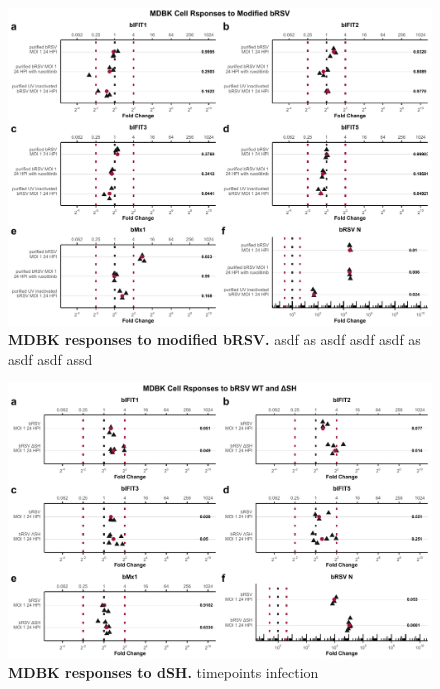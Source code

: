 \begin{figure}
    \centering
    \includegraphics[width=1\linewidth]{07. Chapter 2/Figs/02. Induction/04. mdbk_brsv_uv_roxo.pdf}
    \caption[MDBK responses to modified bRSV.]{\textbf{MDBK responses to modified bRSV.} asdf as asdf asdf asdf as asdf asdf assd }
    \label{MDBK responses to modified bRS}
\end{figure}

\begin{figure}
    \centering
    \includegraphics[width=1\linewidth]{07. Chapter 2/Figs/02. Induction/05. mdbk_brsv_moi1_dsh.pdf}
    \caption[MDBK responses to dSH.]{\textbf{MDBK responses to dSH.} timepoints infection }
    \label{MDBK responses to dSH}
\end{figure}

